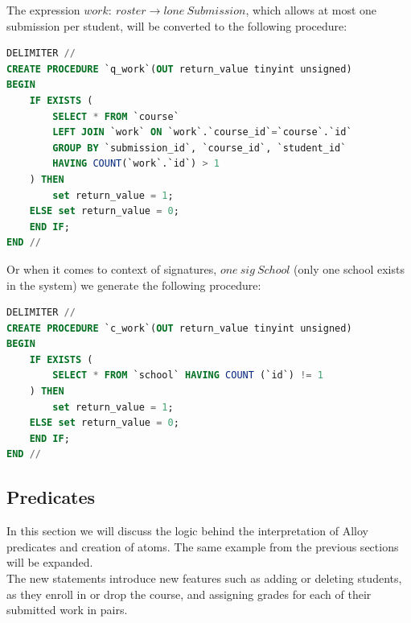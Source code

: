 \documentclass[oneside]{book}
\begin{document}
The expression $work:\ roster \rightarrow lone\ Submission$, which allows at most one submission per student, will be converted to the following procedure:

\begin{lstlisting}[escapechar=@,language=SQL]
DELIMITER //
CREATE PROCEDURE `q_work`(OUT return_value tinyint unsigned)
BEGIN
	IF EXISTS (
		SELECT * FROM `course`
		LEFT JOIN `work` ON `work`.`course_id`=`course`.`id`
		GROUP BY `submission_id`, `course_id`, `student_id` 
		HAVING COUNT(`work`.`id`) > 1
	) THEN
		set return_value = 1;
	ELSE set return_value = 0;
	END IF;
END //
\end{lstlisting}

Or when it comes to context of signatures, $one\ sig\ School {}$ (only one school exists in the system) we generate the following procedure:

\begin{lstlisting}[escapechar=@,language=SQL]
DELIMITER //
CREATE PROCEDURE `c_work`(OUT return_value tinyint unsigned)
BEGIN
	IF EXISTS (
		SELECT * FROM `school` HAVING COUNT (`id`) != 1
	) THEN
		set return_value = 1;
	ELSE set return_value = 0;
	END IF;
END //
\end{lstlisting}

\subsection{Predicates}
\label{sec:predicatesgen}
In this section we will discuss the logic behind the interpretation of Alloy predicates and creation of atoms. The same example from the previous sections will be expanded.\\

\noindent The new statements introduce new features such as adding or deleting students, as they enroll in or drop the course, and assigning grades for each of their submitted work in pairs.\\
\end{document}
